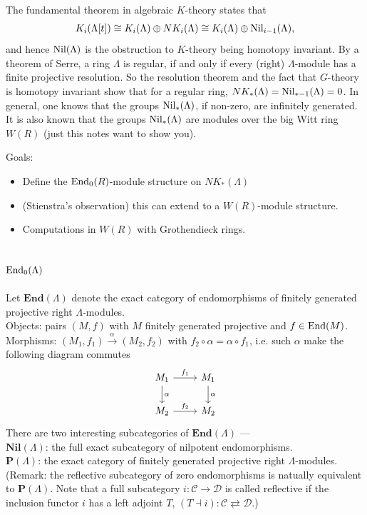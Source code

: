 The fundamental theorem in algebraic $K$-theory states that
\[K_i(\Lambda[t])\cong K_i(\Lambda)\oplus NK_i(\Lambda)\cong K_i(\Lambda)\oplus \mathrm{Nil}_{i-1}(\Lambda),\]
and hence $\mathrm{Nil}(\Lambda)$ is the obstruction to $K$-theory being homotopy invariant. By a theorem of Serre, a ring $\Lambda$ is regular, if and only if every (right) $\Lambda$-module has a finite projective resolution. So the resolution theorem and the fact that $G$-theory is homotopy invariant show that for a regular ring, $NK_
*(\Lambda)=\mathrm{Nil}_{*-1}(\Lambda) = 0$. In general, one knows that the groups $\mathrm{Nil}_*(\Lambda)$, if non-zero, are infinitely generated. It is also known that the groups $\mathrm{Nil}_*(\Lambda)$ are modules over the big Witt ring $W(R)$ (just this notes want to show you).

Goals:
\begin{itemize}
	\item Define the $\mathrm{End}_0(R)$-module structure on $NK_*(\Lambda)$ 
	\item (Stienstra's observation) this can extend to a $W(R)$-module structure.
	\item Computations in $W(R)$ with Grothendieck rings.
\end{itemize}
\subsection{$\mathrm{End}_0(\Lambda)$}
Let $\mathbf{End}(\Lambda)$ denote the exact category of endomorphisms of finitely generated projective right $\Lambda$-modules.\\
Objects: pairs $(M,f)$ with $M$ finitely generated projective and $f\in \mathrm{End}(M)$.\\
Morphisms: $(M_1,f_1) \overset{\alpha}\longrightarrow (M_2,f_2)$ with $f
_2\circ \alpha =\alpha \circ f_1$, i.e. such $\alpha$ make the following diagram commutes
\[
\begin{tikzcd}
	M_1 \arrow[r,"f_1"] \arrow[d,"\alpha"] & M_1 \arrow[d,"\alpha"]\\
	M_2 \arrow[r,"f_2"]  & M_2
\end{tikzcd}
\]
There are two interesting subcategories of $\mathbf{End}(\Lambda)$ --- \\
$\mathbf{Nil}(\Lambda)$: the full exact subcategory of nilpotent endomorphisms.\\
$\mathbf{P}(\Lambda)$: the exact category of finitely generated projective right $\Lambda$-modules. (Remark: the reflective subcategory of zero endomorphisms is natually equivalent to $\mathbf{P}(\Lambda)$. Note that a full subcategory $i\colon \mathcal{C} \longrightarrow \mathcal{D}$ is called reflective if the inclusion functor $i$ has a left adjoint $T$, $(T \dashv i) \colon \mathcal{C}  \rightleftarrows \mathcal{D}$.)

